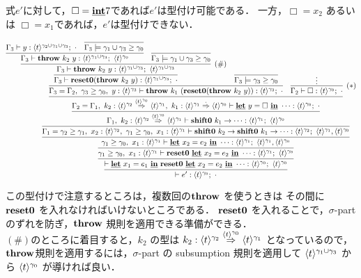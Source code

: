 式$e'$に対して，$\Box=\underline{\textbf{int}}7$であれば$e'$は型付け可能である．
一方，$\Box=x_2$ あるいは $\Box=x_1$であれば，$e'$は型付けできない．

\def\proofone{
  \infer
  {\vdash e':\tzero;~\cdot{}}
  {
    \infer{\vdash \cLet~x_1=e_1~\cIn~\Resetz~\cLet~x_2=e_2~\cIn~\cdots :
      \tzero;~\tzero
    }
    {\infer{\longer{\gamma_1}{\gamma_0},~x_1:\tone \vdash
        \Resetz~\cLet~x_2=e_2~\cIn~\cdots : \tone;~\tzero
      }
      {\prooftwo}
    }
  }
}
\def\prooftwo{
  \infer{\longer{\gamma_1}{\gamma_0},~x_1:\tone \vdash
    \cLet~x_2=e_2~\cIn~\cdots : \tone;~\tone,\tzero}
  {\infer{\Gamma_1=\longer{\gamma_2}{\gamma_1},~x_2:\ttwo,~\longer{\gamma_1}{\gamma_0},~x_1:\tone \vdash
      \shiftz{k_2}{\shiftz{k_1}{\cdots}} : \ttwo;~\tone,\tzero
    }
    {\proofthree}
  }
}

\def\proofthree{
  \infer{\Gamma_1,~k_2:\contT{\ttwo}{\tone}{\tzero}
    \vdash \shiftz{k_1}{\cdots} : \tone;~ \tzero
  }
  {\infer{\Gamma_2=\Gamma_1,~k_2:\contT{\ttwo}{\tone}{\tzero},
      ~k_1:\contT{\tone}{\tzero}{\cdot{}}
      \vdash \cLet~ y=\Box~ \cIn~\cdots : \tzero;~\cdot{}
    }
    {\prooffour}
  }
}

\def\prooffour{
  \infer{\Gamma_3=\Gamma_2,~\longer{\gamma_3}{\gamma_0},~y:\tthree \vdash \throw{k_1}{(\Resetz(\throw{k_2}{y}))} : \tthree;~\cdot{}}
  {\prooffive}
  & \infer[(*)]{\Gamma_2 \vdash \Box : \tzero;~ \cdot}{\vdots}
}

\def\prooffive{
  \infer
  {\Gamma_3 \vdash \Resetz(\throw{k_2}{y}) : \tonethree; ~\cdot{}}
  {\infer[(\#)]
    {\Gamma_3 \vdash \throw{k_2}{y} : \tonethree;~\tonethree}
    {\infer
      {\Gamma_3 \vdash \throw{k_2}{y} : \tonethree;~\tzero}
      {\Gamma_3 \vdash y :
        \codeT{t}{\gamma_2\uni\gamma_1\uni\gamma_3};~\cdot
        & \infer{\Gamma_3 \models
          \longer{\gamma_1\uni\gamma_3}{\gamma_0}}{}
      }
      & \infer{\Gamma_3 \models \longer{\gamma_1\uni\gamma_3}{\gamma_0}}{}
    }
  }
  & \infer{\Gamma_3 \models \longer{\gamma_3}{\gamma_0}}{}
}

\[
  \proofone
\]

この型付けで注意するところは，複数回の$\textbf{throw}$ を使うときは その間に $\textbf{reset0}$ を入れなければいけないところである．
$\textbf{reset0}$ を入れることで，$\sigma$-part のずれを防ぎ，$\textbf{throw}$ 規則を適用できる準備ができる．\\
$(\#)$のところに着目すると，$k_2$ の型は $k_2:{\langle{t}\rangle^{\gamma_2}} \stackrel{\langle{t}\rangle^{\gamma_0}}{\Rightarrow} {\langle{t}\rangle^{\gamma_1}}$ となっているので，$\textbf{throw}$規則を適用するには，$\sigma$-part の subsumption 規則を適用して $\langle{t}\rangle^{\gamma_1\cup\gamma_3}$ から $\langle{t}\rangle^{\gamma_0}$ が導ければ良い．

